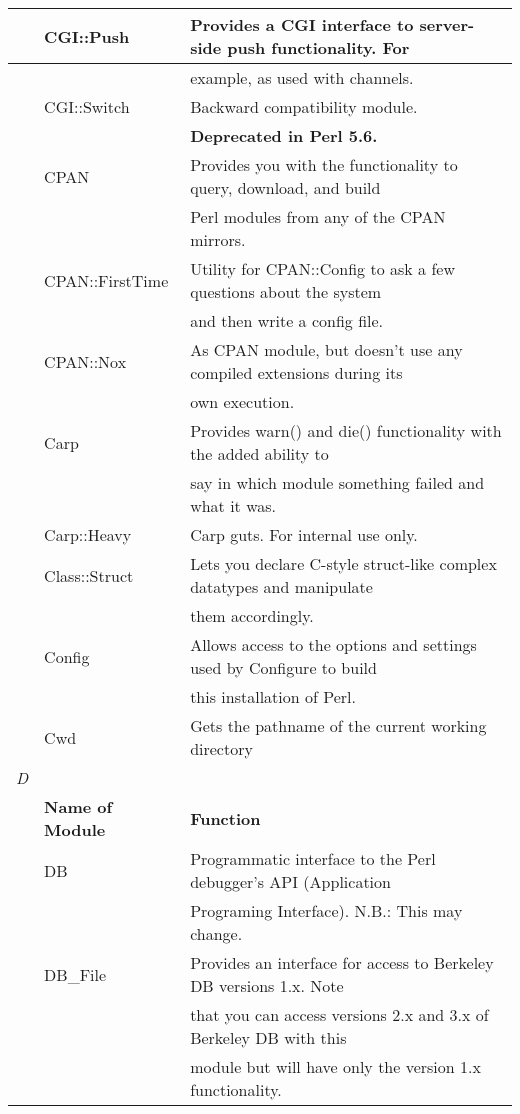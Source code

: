 \documentclass[a4paper,11pt]{book}
\begin{document}
\begin{tabular}{|p{0.2in}|p{1.0in}|p{2.9in}|}
 & CGI::Push & Provides a CGI interface to server-side push functionality. For \\ \hline 
 &  & example, as used with channels. \\ \hline 
 & CGI::Switch & Backward compatibility module. \\ \hline 
 &  & \textbf{Deprecated in Perl 5.6.} \\ \hline 
 & CPAN & Provides you with the functionality to query, download, and build \\ \hline 
 &  & Perl modules from any of the CPAN mirrors. \\ \hline 
 & CPAN::FirstTime & Utility for CPAN::Config to ask a few questions about the system \\ \hline 
 &  & and then write a config file. \\ \hline 
 & CPAN::Nox & As CPAN module, but doesn't use any compiled extensions during its \\ \hline 
 &  & own execution. \\ \hline 
 & Carp & Provides warn() and die() functionality with the added ability to \\ \hline 
 &  & say in which module something failed and what it was. \\ \hline 
 & Carp::Heavy & Carp guts. For internal use only. \\ \hline 
 & Class::Struct & Lets you declare C-style struct-like complex datatypes and manipulate \\ \hline 
 &  & them accordingly. \\ \hline 
 & Config & Allows access to the options and settings used by Configure to build \\ \hline 
 &  & this installation of Perl. \\ \hline 
 & Cwd & Gets the pathname of the current working directory \\ \hline 
\newline \textit{D} &  &  \\ \hline 
 & \textbf{Name of Module} & \textbf{Function} \\ \hline 
 & DB & Programmatic interface to the Perl debugger's API (Application \\ \hline 
 &  & Programing Interface). N.B.: This may change. \\ \hline 
 & DB\_File & Provides an interface for access to Berkeley DB versions 1.x. Note \\ \hline 
 &  & that you can access versions 2.x and 3.x of Berkeley DB with this \\ \hline 
 &  & module but will have only the version 1.x functionality. \\ \hline 
\end{tabular}
\end{document}
